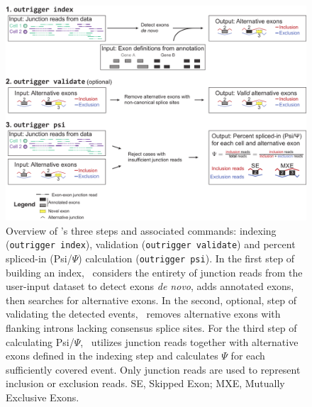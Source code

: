 \begin{figure}[h]
  \centering
  \includegraphics[width=5.6in]{figures/outrigger_overview.pdf}
  \caption[Overview of \outrigger's three steps and associated commands: indexing (\texttt{outrigger index}), validation (\texttt{outrigger validate}) and percent spliced-in (Psi/$\Psi$) calculation (\texttt{outrigger psi})]{Overview of \outrigger's three steps and associated commands: indexing (\texttt{outrigger index}), validation (\texttt{outrigger validate}) and percent spliced-in (Psi/$\Psi$) calculation (\texttt{outrigger psi}). In the first step of building an index, \outrigger\, considers the entirety of junction reads from the user-input dataset to detect exons \emph{de novo}, adds annotated exons, then searches for alternative exons. In the second, optional, step of validating the detected events, \outrigger\, removes alternative exons with flanking introns lacking consensus splice sites. For the third step of calculating Psi/$\Psi$, \outrigger\, utilizes junction reads together with alternative exons defined in the indexing step and calculates $\Psi$ for each sufficiently covered event. Only junction reads are used to represent inclusion or exclusion reads. SE, Skipped Exon; MXE, Mutually Exclusive Exons.
  }
  \label{fig:outrigger_overview}
\end{figure}




